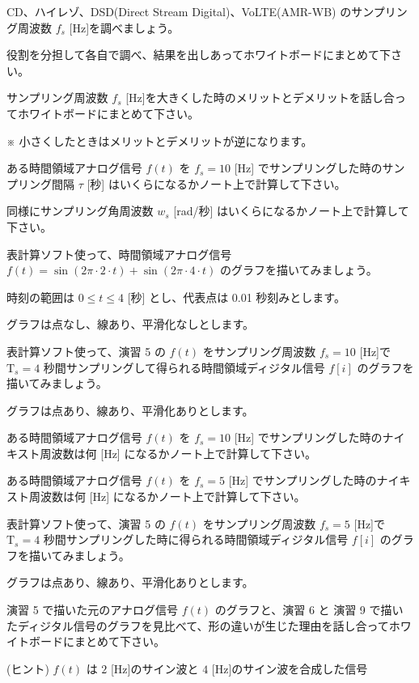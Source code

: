 \documentclass[a4paper]{jarticle}
\begin{document}


 CD、ハイレゾ、DSD(Direct Stream Digital)、VoLTE(AMR-WB) のサンプリング周波数 $f_s$ [Hz]を調べましょう。\par
\noindent 役割を分担して各自で調べ、結果を出しあってホワイトボードにまとめて下さい。

 サンプリング周波数 $f_s$ [Hz]を大きくした時のメリットとデメリットを話し合ってホワイトボードにまとめて下さい。\par
\noindent ※ 小さくしたときはメリットとデメリットが逆になります。

 ある時間領域アナログ信号 $f(t)$ を $f_s = 10$ [Hz] でサンプリングした時のサンプリング間隔 $\tau$ [秒] はいくらになるかノート上で計算して下さい。

 同様にサンプリング角周波数 $w_s$ [rad/秒] はいくらになるかノート上で計算して下さい。

 表計算ソフト使って、時間領域アナログ信号
$f(t) = \sin( 2\pi\cdot 2 \cdot t ) + \sin( 2\pi\cdot 4 \cdot t )$ のグラフを描いてみましょう。\par
\noindent 時刻の範囲は $0 \leq t \leq 4$ [秒] とし、代表点は 0.01 秒刻みとします。 \par
\noindent グラフは点なし、線あり、平滑化なしとします。

 表計算ソフト使って、演習 5 の $f(t)$ をサンプリング周波数 $f_s = 10$ [Hz]で $\textrm{T}_s = 4$ 秒間サンプリングして得られる時間領域ディジタル信号 $f[i]$ のグラフを描いてみましょう。\par
\noindent グラフは点あり、線あり、平滑化ありとします。


 ある時間領域アナログ信号 $f(t)$ を $f_s = 10$ [Hz] でサンプリングした時のナイキスト周波数は何 [Hz] になるかノート上で計算して下さい。

 ある時間領域アナログ信号 $f(t)$ を $f_s = 5$ [Hz] でサンプリングした時のナイキスト周波数は何 [Hz] になるかノート上で計算して下さい。


 表計算ソフト使って、演習 5 の $f(t)$ をサンプリング周波数 $f_s = 5$ [Hz]で $\textrm{T}_s = 4$ 秒間サンプリングした時に得られる時間領域ディジタル信号 $f[i]$ のグラフを描いてみましょう。\par
\noindent グラフは点あり、線あり、平滑化ありとします。

 演習 5 で描いた元のアナログ信号 $f(t)$ のグラフと、演習 6 と 演習 9 で描いたディジタル信号のグラフを見比べて、形の違いが生じた理由を話し合ってホワイトボードにまとめて下さい。\par
\noindent (ヒント) $f(t)$ は $2$ [Hz]のサイン波と $4$ [Hz]のサイン波を合成した信号

\savepractime
\end{document}
